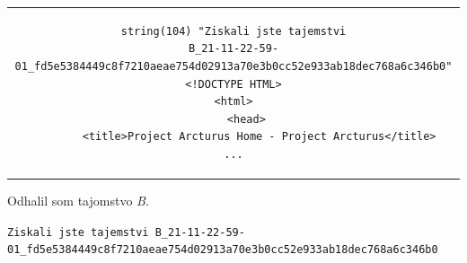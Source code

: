 \documentclass[11pt,a4paper]{article}
\begin{document}
\begin{center}
\begin{tabular}{c}
\begin{lstlisting}[basicstyle=\footnotesize]
string(104) "Ziskali jste tajemstvi
B_21-11-22-59-01_fd5e5384449c8f7210aeae754d02913a70e3b0cc52e933ab18dec768a6c346b0"
<!DOCTYPE HTML>
<html>
    <head>
        <title>Project Arcturus Home - Project Arcturus</title>
...
\end{lstlisting}
\end{tabular}
\end{center}

Odhalil som tajomstvo \textit{B}.

\begin{center}
\small{\texttt{Ziskali jste tajemstvi B\_21-11-22-59-01\_fd5e5384449c8f7210aeae754d02913a70e3b0cc52e933ab18dec768a6c346b0}}
\end{center}

%
%    
\end{document}

